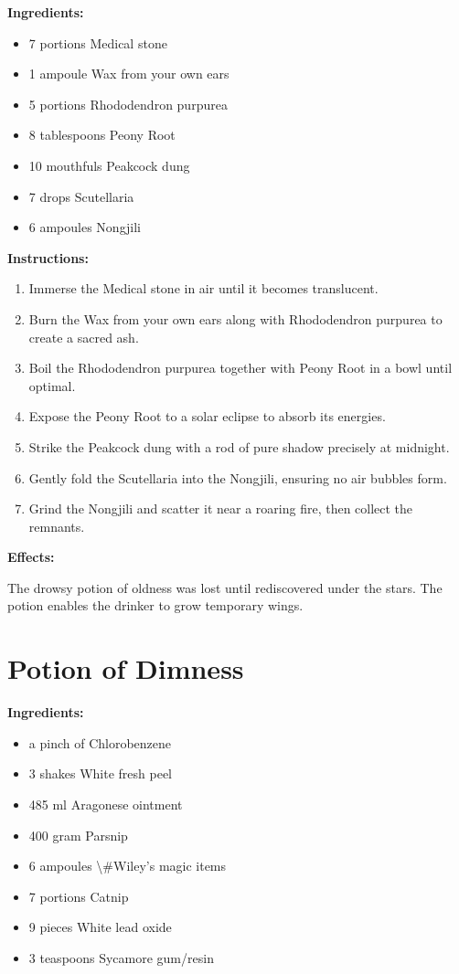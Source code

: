 \documentclass{article}
\begin{document}
\textbf{Ingredients:}

\begin{itemize}
  \item 7 portions Medical stone
  \item 1 ampoule Wax from your own ears
  \item 5 portions Rhododendron purpurea
  \item 8 tablespoons Peony Root
  \item 10 mouthfuls Peakcock dung
  \item 7 drops Scutellaria
  \item 6 ampoules Nongjili
\end{itemize}

\textbf{Instructions:}

\begin{enumerate}
  \item Immerse the Medical stone in air until it becomes translucent.
  \item Burn the Wax from your own ears along with Rhododendron purpurea to create a sacred ash.
  \item Boil the Rhododendron purpurea together with Peony Root in a bowl until optimal.
  \item Expose the Peony Root to a solar eclipse to absorb its energies.
  \item Strike the Peakcock dung with a rod of pure shadow precisely at midnight.
  \item Gently fold the Scutellaria into the Nongjili, ensuring no air bubbles form.
  \item Grind the Nongjili and scatter it near a roaring fire, then collect the remnants.
\end{enumerate}

\textbf{Effects:}

The drowsy potion of oldness was lost until rediscovered under the stars. The potion enables the drinker to grow temporary wings.

\newpage
\section*{Potion of Dimness}

\textbf{Ingredients:}

\begin{itemize}
  \item a pinch of Chlorobenzene
  \item 3 shakes White fresh peel
  \item 485 ml Aragonese ointment
  \item 400 gram Parsnip
  \item 6 ampoules \textbackslash{}#Wiley's magic items
  \item 7 portions Catnip
  \item 9 pieces White lead oxide
  \item 3 teaspoons Sycamore gum/resin
\end{itemize}
\end{document}
